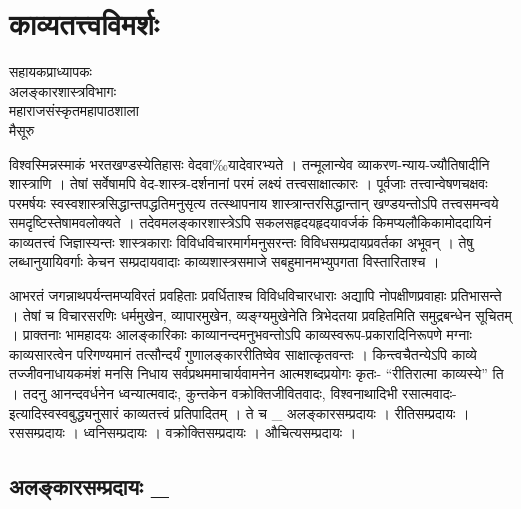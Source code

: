\chapter{काव्यतत्त्वविमर्शः}

\begin{center}
\smallskip

सहायकप्राध्यापकः\\
अलङ्कारशास्त्रविभागः\\
महाराजसंस्कृतमहापाठशाला\\
मैसूरु
\addrule
\end{center}
विश्वस्मिन्नस्माकं भरतखण्डस्येतिहासः वेदवा$‰$यादेवारभ्यते । तन्मूलान्येव व्याकरण-न्याय-ज्यौतिषादीनि शास्त्राणि । तेषां सर्वेषामपि वेद-शास्त्र-दर्शनानां परमं लक्ष्यं तत्त्वसाक्षात्कारः । पूर्वजाः तत्त्वान्वेषणचक्षवः परमर्षयः स्वस्वशास्त्रसिद्धान्तपद्धतिमनुसृत्य तत्स्थापनाय शास्त्रान्तरसिद्धान्तान् खण्डयन्तोऽपि तत्त्वसमन्वये समदृष्टिस्तेषामवलोक्यते ।  तदेवमलङ्कारशास्त्रेऽपि सकलसहृदयहृदयावर्जकं किमप्यलौकिकामोददायिनं काव्यतत्त्वं जिज्ञास्यन्तः शास्त्रकाराः विविधविचारमार्गमनुसरन्तः विविधसम्प्रदायप्रवर्तका अभूवन् । तेषु लब्धानुयायिवर्गाः केचन सम्प्रदायवादाः काव्यशास्त्रसमाजे सबहुमानमभ्युपगता विस्तारिताश्च ।

आभरतं जगन्नाथपर्यन्तमप्यविरतं प्रवहिताः प्रवर्धिताश्च विविधविचारधाराः अद्यापि नोपक्षीणप्रवाहाः प्रतिभासन्ते । तेषां च विचारसरणिः धर्ममुखेन, व्यापारमुखेन, व्यङ्ग्यमुखेनेति त्रिभेदतया प्रवहितमिति समुद्रबन्धेन सूचितम् । प्राक्तनाः भामहादयः आलङ्कारिकाः काव्यानन्दमनुभवन्तोऽपि काव्यस्वरूप-प्रकारादिनिरूपणे मग्नाः काव्यसारत्वेन परिगण्यमानं तत्सौन्दर्यं गुणालङ्काररीतिष्वेव साक्षात्कृतवन्तः । किन्त्वचैतन्येऽपि काव्ये तज्जीवनाधायकमंशं मनसि निधाय सर्वप्रथममाचार्यवामनेन आत्मशब्दप्रयोगः कृतः- “रीतिरात्मा काव्यस्ये” ति ।  तदनु आनन्दवर्धनेन ध्वन्यात्मवादः, कुन्तकेन वक्रोक्तिजीवितवादः, विश्वनाथादिभी रसात्मवादः- इत्यादिस्वस्वबुद्ध्यनुसारं काव्यतत्त्वं प्रतिपादितम् । ते च \_    अलङ्कारसम्प्रदायः ।     रीतिसम्प्रदायः ।	     रससम्प्रदायः ।   ध्वनिसम्प्रदायः ।	   वक्रोक्तिसम्प्रदायः ।   औचित्यसम्प्रदायः ।

\section*{ अलङ्कारसम्प्रदायः \_}

